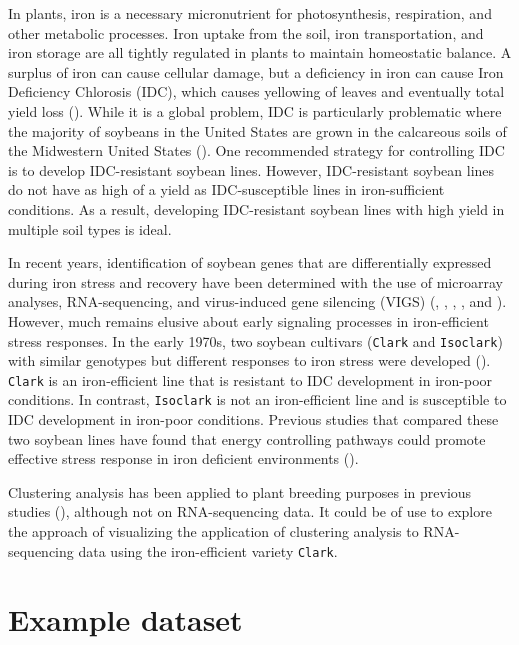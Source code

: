 \documentclass[11pt,a4paper,oldfontcommands,openany]{memoir}
\numberwithin{equation}{section} %
\newcommand{\code}[1]{{\texttt{#1}}}
\begin{document}
In plants, iron is a necessary micronutrient for photosynthesis, respiration, and other metabolic processes. Iron uptake from the soil, iron transportation, and iron storage are all tightly regulated in plants to maintain homeostatic balance. A surplus of iron can cause cellular damage, but a deficiency in iron can cause Iron Deficiency Chlorosis (IDC), which causes yellowing of leaves and eventually total yield loss (\citealt{soy1}). While it is a global problem, IDC is particularly problematic where the majority of soybeans in the United States are grown in the calcareous soils of the Midwestern United States (\citealt{soy3}). One recommended strategy for controlling IDC is to develop IDC-resistant soybean lines. However, IDC-resistant soybean lines do not have as high of a yield as IDC-susceptible lines in iron-sufficient conditions. As a result, developing IDC-resistant soybean lines with high yield in multiple soil types is ideal.

In recent years, identification of soybean genes that are differentially expressed during iron stress and recovery have been determined with the use of microarray analyses, RNA-sequencing, and virus-induced gene silencing (VIGS) (\citealt{soy11}, \citealt{soy12}, \citealt{soy13}, \citealt{soy14}, and \citealt{soy15}). However, much remains elusive about early signaling processes in iron-efficient stress responses. In the early 1970s, two soybean cultivars (\code{Clark} and \code{Isoclark}) with similar genotypes but different responses to iron stress were developed (\citealt{soy10}). \code{Clark} is an iron-efficient line that is resistant to IDC development in iron-poor conditions. In contrast, \code{Isoclark} is not an iron-efficient line and is susceptible to IDC development in iron-poor conditions. Previous studies that compared these two soybean lines have found that energy controlling pathways could promote effective stress response in iron deficient environments (\citealt{soy11}).

Clustering analysis has been applied to plant breeding purposes in previous studies (\citealt{extra5}), although not on RNA-sequencing data. It could be of use to explore the approach of visualizing the application of clustering analysis to RNA-sequencing data using the iron-efficient variety \code{Clark}.

\section{Example dataset}
\end{document}
